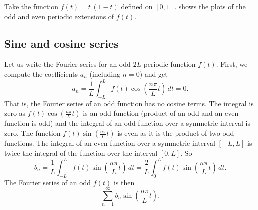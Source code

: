 \begin{example}
Take the function $f(t) = t\,(1-t)$ defined on $[0,1]$. 
shows the plots of the odd and even periodic extensions of $f(t)$.

\begin{myfig}
\capstart
\caption{Odd and even 2-periodic extension of $f(t) =
t\,(1-t)$, $0 \leq t \leq 1$.\label{scs:oddevenextfig}}
\end{myfig}
\end{example}

\subsection{Sine and cosine series}

Let us write the Fourier series for
an odd $2L$-periodic function $f(t)$.
First, we compute the coefficients $a_n$ (including
$n=0$) and get
\begin{equation*}
a_n = \frac{1}{L} \int_{-L}^L f(t) \cos \left( \frac{n \pi}{L} t \right)
\, dt = 0 .
\end{equation*}
That is, the Fourier series of an odd function has no cosine terms.
The integral is zero
as $f(t) \cos \left( \frac{n \pi}{L} t \right)$
is an odd function (product of an odd and an
even function is odd) and the integral of an odd function over a symmetric
interval is zero.
The function $f(t) \sin \left( \frac{n \pi}{L} t \right)$ is even
as it is the product of two odd
functions.
The integral of an even function over a symmetric interval
$[-L,L]$ is twice the integral of the function over the interval $[0,L]$.
So
\begin{equation*}
b_n = 
\frac{1}{L} \int_{-L}^L f(t) \sin \left( \frac{n \pi}{L} t \right) \, dt =
\frac{2}{L} \int_{0}^L f(t) \sin \left( \frac{n \pi}{L} t \right) \, dt .
\end{equation*}
The Fourier series of an odd $f(t)$ is then
\begin{equation*}
\sum_{n=1}^\infty b_n \sin \left( \frac{n \pi}{L} t \right) .
\end{equation*}

